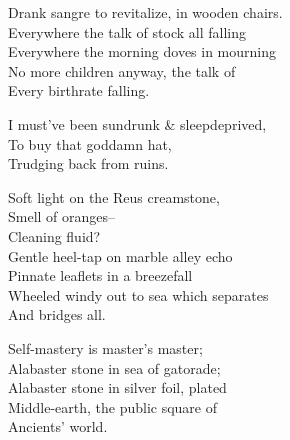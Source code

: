 Drank sangre to revitalize, in wooden chairs. \\
Everywhere the talk of stock all falling \\
Everywhere the morning doves in mourning \\
No more children anyway, the talk of \\
Every birthrate falling.

I must've been sundrunk \& sleepdeprived, \\
To buy that goddamn hat, \\
Trudging back from ruins. 

Soft light on the Reus creamstone, \\
Smell of oranges-- \\
Cleaning fluid? \\
Gentle heel-tap on marble alley echo \\
Pinnate leaflets in a breezefall \\
Wheeled windy out to sea which separates \\
And bridges all.

Self-mastery is master's master; \\
Alabaster stone in sea of gatorade; \\
Alabaster stone in silver foil, plated \\
Middle-earth, the public square of \\
Ancients' world.